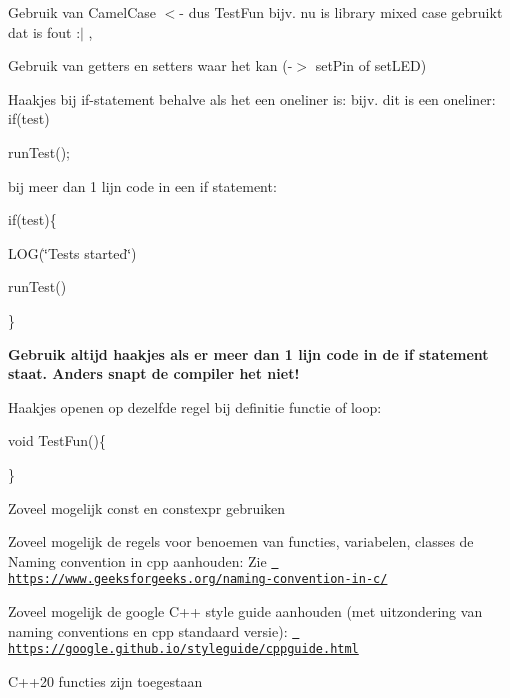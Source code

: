 
\begin{DoxyItemize}
\item Gebruik van Camel\+Case \texorpdfstring{$<$}{<}-\/ dus Test\+Fun bijv. nu is library mixed case gebruikt dat is fout \+:$\vert$ ,
\end{DoxyItemize}

Gebruik van getters en setters waar het kan (-\/\texorpdfstring{$>$}{>} set\+Pin of set\+LED)


\begin{DoxyItemize}
\item Haakjes bij if-\/statement behalve als het een oneliner is\+: bijv. dit is een oneliner\+: if(test)

run\+Test();

bij meer dan 1 lijn code in een if statement\+:

if(test)\{

LOG(\char`\"{}\+Tests started\char`\"{})

run\+Test() ~\newline


\}

{\bfseries{Gebruik altijd haakjes als er meer dan 1 lijn code in de if statement staat. Anders snapt de compiler het niet!}}
\item Haakjes openen op dezelfde regel bij definitie functie of loop\+:

void Test\+Fun()\{

\}
\item Zoveel mogelijk const en constexpr gebruiken
\item Zoveel mogelijk de regels voor benoemen van functies, variabelen, classes de Naming convention in cpp aanhouden\+: Zie \href{https://www.geeksforgeeks.org/naming-convention-in-c/}{\texttt{ https\+://www.\+geeksforgeeks.\+org/naming-\/convention-\/in-\/c/}}
\item Zoveel mogelijk de google C++ style guide aanhouden (met uitzondering van naming conventions en cpp standaard versie)\+: \href{https://google.github.io/styleguide/cppguide.html}{\texttt{ https\+://google.\+github.\+io/styleguide/cppguide.\+html}}
\item C++20 functies zijn toegestaan 
\end{DoxyItemize}